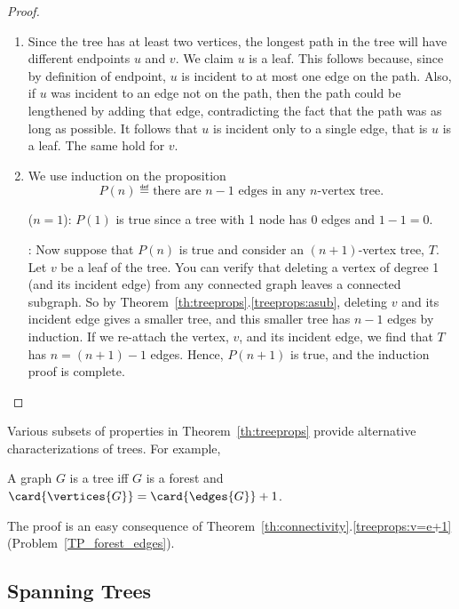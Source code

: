 \begin{proof}
\begin{enumerate}
\item

  Since the tree has at least two vertices, the longest path in the
  tree will have different endpoints $u$ and $v$.  We claim $u$ is a
  leaf.  This follows because, since by definition of endpoint, $u$ is
  incident to at most one edge on the path.  Also, if $u$ was incident to
  an edge not on the path, then the path could be lengthened by adding
  that edge, contradicting the fact that the path was as long as
  possible.  It follows that $u$ is incident only to a single edge,
  that is $u$ is a leaf.  The same hold for $v$.

\item We use induction on the proposition
\[
P(n) \eqdef \text{there are $n - 1$ edges in any $n$-vertex tree}.
\]

 ($n = 1$): $P(1)$ is true since a tree with
1 node has 0 edges and $1 - 1 = 0$.

: Now suppose that $P(n)$ is true and
consider an $(n+1)$-vertex tree, $T$.  Let $v$ be a leaf of the tree.
You can verify that deleting a vertex of degree 1 (and its incident
edge) from any connected graph leaves a connected subgraph.  So by
Theorem~\ref{th:treeprops}.\ref{treeprops:asub}, deleting $v$ and its
incident edge gives a smaller tree, and this smaller tree has $n - 1$
edges by induction.  If we re-attach the vertex, $v$, and its incident
edge, we find that $T$ has $n = (n + 1) - 1$ edges.  Hence, $P(n + 1)$
is true, and the induction proof is complete.  \qedhere

\end{enumerate}

\end{proof}

Various subsets of properties in Theorem~\ref{th:treeprops} provide
alternative characterizations of trees.  For example,

\begin{lemma}\label{lem:iffe=v-1}
A graph $G$ is a tree iff $G$ is a forest and $\card{\vertices{G}} =
\card{\edges{G}} +1$.
\end{lemma}

The proof is an easy consequence of
Theorem~\ref{th:connectivity}.\ref{treeprops:v=e+1}
(Problem~\ref{TP_forest_edges}).

\subsection{Spanning Trees}\label{spantree_subsec}

